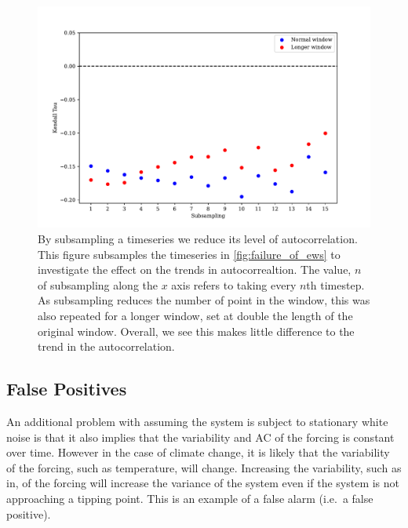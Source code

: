 \begin{figure}
  \centering
  \includegraphics[width=\textwidth]{subsampling}
  \caption[Effect of Subsampling]{By subsampling a timeseries we reduce its level of autocorrelation. This figure subsamples the timeseries in
    \cref{fig:failure_of_ews} to investigate the effect on the trends in autocorrealtion. The value, $n$ of subsampling along the $x$ axis refers to taking
    every $n$th timestep. As subsampling reduces the number of point in the window, this was also repeated for a longer window, set at double the length of the
  original window. Overall, we see this makes little difference to the trend in the autocorrelation.}
  \label{fig:subsampling}
\end{figure}


\subsection{False Positives}
An additional problem with assuming the system is subject to stationary white noise is that it also implies that the
variability and AC of the forcing is constant over time. 
However in the case of 
climate change, it is likely that the variability of the forcing,
such as temperature, will change\cite{Huntingford2013}. 
Increasing the variability, such as in\cite{Boers2021a}, of the forcing will increase the variance of the system even
if the system is not approaching a tipping point. This is an example of a false
alarm (i.e.\ a false positive). 

